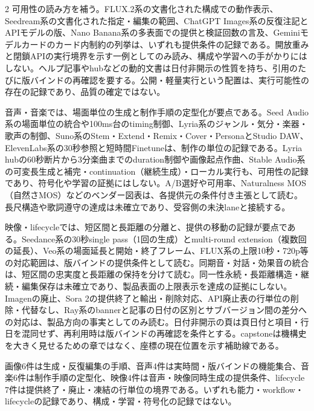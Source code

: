 \documentclass[lualatex,a4paper,10pt]{jlreq}
\begin{document}
\begin{multicols}{2}
可用性の読み方を補う。FLUX.2系の文書化された構成での動作表示、Seedream系の文書化された指定・編集の範囲、ChatGPT Images系の反復注記とAPIモデルの版、Nano Banana系の多表面での提供と検証回数の言及、Geminiモデルカードのカード内制約の列挙は、いずれも提供条件の記録である\autocite{btd100}\autocite{btd101}\autocite{btd102}\autocite{btd103}\autocite{btd104}\autocite{btd105}。開放重みと閉鎖APIの実行境界を示す一例としてのみ読み、構成や学習への手がかりにはしない。ヘルプ記事やhubなどの動的文書は日付非開示の性質を持ち、引用のたびに版バインドの再確認を要する。公開・軽量実行という配置は、実行可能性の存在の記録であり、品質の確定ではない。

音声・音楽では、場面単位の生成と制作手順の定型化が要点である。Seed Audio系の場面単位の統合や100ms台のtiming制御、Lyria系のジャンル・気分・楽器・歌声の制御、Suno系のStem・Extend・Remix・Cover・PersonaとStudio DAW、ElevenLabs系の30秒参照と短時間Finetuneは、制作の単位の記録である\autocite{btd110}\autocite{btd111}\autocite{btd114}\autocite{btd115}\autocite{btd116}。Lyria hubの60秒断片から3分楽曲までのduration制御や画像起点作曲、Stable Audio系の可変長生成と補完・continuation（継続生成）・ローカル実行も、可用性の記録であり、符号化や学習の証拠にはしない\autocite{btd112}\autocite{btd113}。A/B選好や可用率、Naturalness MOS（自然さMOS）などのベンダー図表は、各提供元の条件付き主張として読む。長尺構造や歌詞遵守の達成は未確立であり、受容側の未決laneと接続する。

映像・lifecycleでは、短区間と長距離の分離と、提供の移動の記録が要点である。Seedance系の30秒single pass（1回の生成）とmulti-round extension（複数回の延長）、Veo系の場面延長と開始・終了フレーム、FLUX系の上限10秒・720p等の対応範囲は、版バインドの提供条件として読む\autocite{btd117}\autocite{btd118}\autocite{btd119}。同期音・対話・効果音の統合は、短区間の忠実度と長距離の保持を分けて読む。同一性永続・長距離構造・継続・編集保存は未確立であり、製品表面の上限表示を達成の証拠にしない。Imagenの廃止、Sora 2の提供終了と輸出・削除対応、API廃止表の行単位の削除・代替なし、Ray系のbannerと記事の日付の区別とサブバージョン間の差分への対応は、製品方向の事実としてのみ読む\autocite{btd106}\autocite{btd121}\autocite{btd122}\autocite{btd123}\autocite{btd126}\autocite{btd127}\autocite{btd128}。日付非開示の頁は頁日付と項目・行日を混同せず、再利用時は版バインドの再確認を条件とする。capstoneは機構史を大きく見せるための章ではなく、座標の現在位置を示す補助線である。

\begin{themeoverview}[27件の配置見取り図]
画像6件は生成・反復編集の手順、音声4件は実時間・版バインドの機能集合、音楽6件は制作手順の定型化、映像4件は音声・映像同時生成の提供条件、lifecycle 7件は提供終了・廃止・凍結の行単位の境界である。いずれも能力・workflow・lifecycleの記録であり、構成・学習・符号化の記録ではない。
\end{themeoverview}
\autocite{btd100}\autocite{btd107}\autocite{btd111}\autocite{btd076}\autocite{btd106}
\end{multicols}
\end{document}
